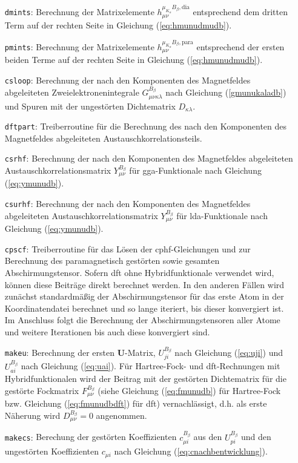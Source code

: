 \begin{itemize}[leftmargin=60pt]
\item[\texttt{dmints}:] Berechnung der Matrixelemente $h_{\mu\nu}^{\mu_{K_\alpha}B_\beta,\textrm{dia}}$ entsprechend dem dritten Term auf der rechten Seite in Gleichung (\ref{eq:hmunudmudb}).
\item[\texttt{pmints}:] Berechnung der Matrixelemente $h_{\mu\nu}^{\mu_{K_\alpha}B_\beta,\textrm{para}}$ entsprechend der ersten beiden Terme auf der rechten Seite in Gleichung (\ref{eq:hmunudmudb}).
\item[\texttt{csloop}:] Berechnung der nach den Komponenten des Magnetfeldes abgeleiteten Zweielektronenintegrale $G_{\mu\nu\kappa\lambda}^{B_\beta}$ nach Gleichung (\ref{gmunukaladb}) und Spuren mit der ungestörten Dichtematrix $D_{\kappa\lambda}$.
\item[\texttt{dftpart}:] Treiberroutine für die Berechnung des nach den Komponenten des Magnetfeldes abgeleiteten Austauschkorrelationsteils.
\item[\texttt{csrhf}:] Berechnung der nach den Komponenten des Magnetfeldes abgeleiteten Austauschkorrelationsmatrix $Y_{\mu\nu}^{B_\beta}$ für \ac{gga}-Funktionale nach Gleichung (\ref{eq:ymunudb}).
\item[\texttt{csurhf}:] Berechnung der nach den Komponenten des Magnetfeldes abgeleiteten Austauschkorrelationsmatrix $Y_{\mu\nu}^{B_\beta}$ für \ac{lda}-Funktionale nach Gleichung (\ref{eq:ymunudb}).
\item[\texttt{cpscf}:] Treiberroutine für das Lösen der \ac{cphf}-Gleichungen und zur Berechnung des paramagnetisch gestörten sowie gesamten Abschirmungstensor. Sofern \ac{dft} ohne Hybridfunktionale verwendet wird, können diese Beiträge direkt berechnet werden. In den anderen Fällen wird zunächst standardmäßig der Abschirmungstensor für das erste Atom in der Koordinatendatei berechnet und so lange iteriert, bis dieser konvergiert ist. Im Anschluss folgt die Berechnung der Abschirmungstensoren aller Atome und weitere Iterationen bis auch diese konvergiert sind. 
\item[\texttt{makeu}:] Berechnung der ersten $\boldsymbol {U}$-Matrix, $U_{ji}^{B_\beta}$ nach Gleichung (\ref{eq:uji}) und $U_{ai}^{B_\beta}$ nach Gleichung (\ref{eq:uai}). Für Hartree-Fock- und \ac{dft}-Rechnungen mit Hybridfunktionalen wird der Beitrag mit der gestörten Dichtematrix für die gestörte Fockmatrix $F_{\mu\nu}^{B_\beta}$ (siehe Gleichung (\ref{eq:fmunudb}) für Hartree-Fock bzw. Gleichung (\ref{eq:fmunudbdft}) für \ac{dft}) vernachlässigt, d.h. als erste Näherung wird $D_{\mu\nu}^{B_\beta}=0$ angenommen.
\item[\texttt{makecs}:] Berechung der gestörten Koeffizienten $c_{\mu i}^{B_\beta}$ aus den $U_{pi}^{B_\beta}$ und den ungestörten Koeffizienten $c_{\mu i}$ nach Gleichung (\ref{eq:cnachbentwicklung}).

\end{itemize}

